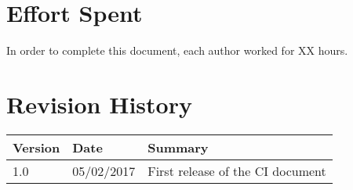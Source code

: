 \documentclass[11pt,a4paper]{report}
\begin{document}
\chapter{Effort Spent}
In order to complete this document, each author worked for XX hours.
\chapter{Revision History}
\begin{tabularx}{\textwidth}{|l|l|X|}
	\hline
	Version & Date & Summary\\
	\hline
	\hline
	1.0 & 05/02/2017 & First release of the CI document\\
	\hline
\end{tabularx}
\end{document}
